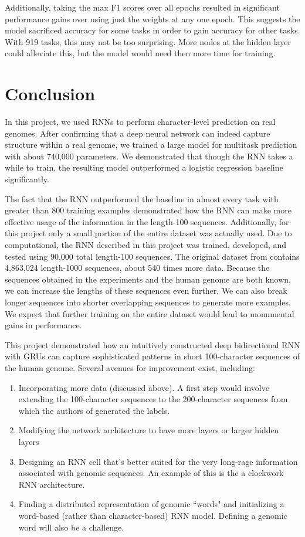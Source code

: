 \documentclass{article} %
\begin{document}
Additionally, taking the max F1 scores over all epochs resulted in significant performance gains over using just the weights at any one epoch. This suggests the model sacrificed accuracy for some tasks in order to gain accuracy for other tasks. With 919 tasks, this may not be too surprising. More nodes at the hidden layer could alleviate this, but the model would need then more time for training.

\section{Conclusion}
In this project, we used RNNs to perform character-level prediction on real genomes. After confirming that a deep neural network can indeed capture structure within a real genome, we trained a large model for multitask prediction with about 740,000 parameters. We demonstrated that though the RNN takes a while to train, the resulting model outperformed a logistic regression baseline significantly.

The fact that the RNN outperformed the baseline in almost every task with greater than 800 training examples demonstrated how the RNN can make more effective usage of the information in the length-100 sequences. Additionally, for this project only a small portion of the entire dataset was actually used. Due to computational, the RNN described in this project was trained, developed, and tested using 90,000 total length-100 sequences. The original dataset from \cite{zhou2015predicting} contains 4,863,024 length-1000 sequences, about 540 times more data. Because the sequences obtained in the experiments and the human genome are both known, we can increase the lengths of these sequences even further. We can also break longer sequences into shorter overlapping sequences to generate more examples. We expect that further training on the entire dataset would lead to monumental gains in performance. 

This project demonstrated how an intuitively constructed deep bidirectional RNN with GRUs can capture sophisticated patterns in short 100-character sequences of the human genome. Several avenues for improvement exist, including:
\begin{enumerate}
	\item Incorporating more data (discussed above). A first step would involve extending the 100-character sequences to the 200-character sequences from which the authors of \cite{zhou2015predicting} generated the labels. 
	\item Modifying the network architecture to have more layers or larger hidden layers
	\item Designing an RNN cell that's better suited for the very long-rage information associated with genomic sequences. An example of this is the a clockwork RNN \cite{koutnik2014clockwork} architecture.
	\item Finding a distributed representation of genomic ``words" and initializing a word-based (rather than character-based) RNN model. Defining a genomic word will also be a challenge.
\end{enumerate}
\end{document}
